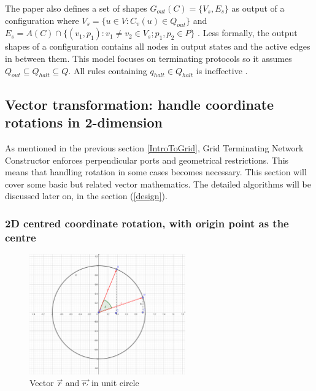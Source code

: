 \par\noindent
The paper \cite{Mi17} also defines a set of
shapes $G_{out}(C) = \{V_{s}, E_{s}\}$ as output of a configuration where $V_{s} = \{u \in V : C_{v}(u) \in Q_{out} \}$
and $E_{s} = A(C) \cap \{ (v_{1}, p_{1}) : v_{1} \not= v_{2} \in V_{s}; p_{1}, p_{2} \in P \}$ \cite{Mi17}.
Less formally, the output shapes of a configuration contains all nodes in output states and the active edges in between them.
This model focuses on terminating protocols so it assumes $Q_{out} \subseteq Q_{halt} \subseteq Q $.
All rules containing $q_{halt} \in Q_{halt} $ is ineffective \cite{Mi17}.

\subsection{Vector transformation: handle coordinate rotations in 2-dimension}


\par\noindent
As mentioned in the previous section \ref{IntroToGrid}, Grid Terminating Network Constructor enforces perpendicular ports
and geometrical restrictions. This means that handling rotation in some cases becomes necessary.
This section will cover some basic but related vector mathematics. The detailed algorithms will be discussed later on, in the section (\ref{design}).

\subsubsection{2D centred coordinate rotation, with origin point as the centre}

\par\noindent

\begin{figure}[H]
\begin{center}
\includegraphics[width=0.6\textwidth]{context/diagram/2d_vector.pdf}
\caption{Vector $\vec{r}$ and $\vec{r_{'}}$ in unit circle}

\label{vectorG}
\end{center}
\end{figure}

